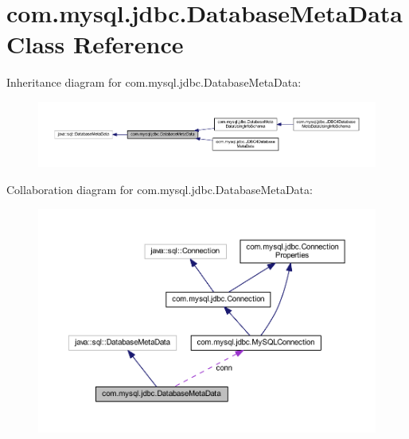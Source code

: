 \hypertarget{classcom_1_1mysql_1_1jdbc_1_1_database_meta_data}{}\section{com.\+mysql.\+jdbc.\+Database\+Meta\+Data Class Reference}
\label{classcom_1_1mysql_1_1jdbc_1_1_database_meta_data}


Inheritance diagram for com.\+mysql.\+jdbc.\+Database\+Meta\+Data\+:\nopagebreak
\begin{figure}[H]
\begin{center}
\leavevmode
\includegraphics[width=350pt]{classcom_1_1mysql_1_1jdbc_1_1_database_meta_data__inherit__graph}
\end{center}
\end{figure}


Collaboration diagram for com.\+mysql.\+jdbc.\+Database\+Meta\+Data\+:\nopagebreak
\begin{figure}[H]
\begin{center}
\leavevmode
\includegraphics[width=350pt]{classcom_1_1mysql_1_1jdbc_1_1_database_meta_data__coll__graph}
\end{center}
\end{figure}
